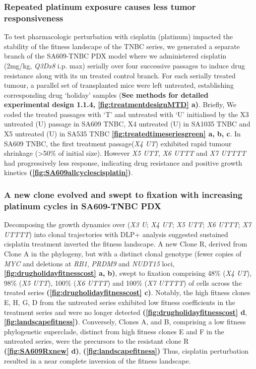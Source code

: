 \subsubsection{Repeated platinum exposure causes less tumor responsiveness} 
 To test pharmacologic perturbation with cisplatin (platinum) impacted the stability of the fitness landscape of the TNBC series, we generated a separate branch of the SA609-TNBC PDX model where we administered cisplatin (2mg/kg, \textit{Q3Dx8} i.p. max) serially over four successive passages to induce drug resistance along with its un treated control branch. For each serially treated tumour, a parallel set of transplanted mice were left untreated, establishing corresponding drug `holiday' samples (\textbf{See methods for detailed experimental design \textbf{1.1.4}, \textbf{\autoref{fig:treatmentdesignMTD} a)}}. Briefly, We coded the treated passages with `T' and untreated with `U' initialised by the X3 untreated (U) passage in SA609 TNBC, X4 untreated (U) in SA1035 TNBC and X5 untreated (U) in SA535 TNBC \textbf{\autoref{fig:treatedtimeseriesgreen} a, b, c}. In SA609 TNBC, the first treatment passage(\textit{X4 UT}) exhibited rapid tumour shrinkage (>50\% of initial size). However \textit{X5 UTT}, \textit{X6 UTTT} and \textit{X7 UTTTT} had progressively less response, indicating drug resistance and positive growth kinetics \textbf{(\autoref{fig:SA609allcyclescisplatin})}. 


\subsubsection{A new clone evolved and swept to fixation with increasing platinum cycles in SA609-TNBC PDX}
Decomposing the growth dynamics over (\textit{X3 U}; \textit{X4 UT}; \textit{X5 UTT}; \textit{X6 UTTT}; \textit{X7 UTTTT}) into clonal trajectories with DLP+ analysis suggested sustained cisplatin treatment inverted the fitness landscape. A new Clone R,  derived from Clone A in the phylogeny, but with a distinct clonal genotype (fewer copies of \textit{MYC} and deletions at \textit{RB1}, \textit{PRDM9} and \textit{NUDT15} loci, \textbf{\autoref{fig:drugholidayfitnesscost} a, b)}, swept to fixation comprising 48\% (\textit{X4 UT}), 98\% (\textit{X5 UTT}), 100\% (\textit{X6 UTTT}) and 100\% (\textit{X7 UTTTT}) of cells across the treated series \textbf{(\autoref{fig:drugholidayfitnesscost} c)}. Notably, the high fitness clones E, H, G, D from the untreated series exhibited low fitness coefficients in the treatment series and were no longer detected \textbf{(\autoref{fig:drugholidayfitnesscost} d}, \textbf{\autoref{fig:landscapefitness})}. Conversely, Clones A, and B, comprising a low fitness phylogenetic superclade, distinct from high fitness clones E and F in the untreated series, were the precursors to the resistant clone R \textbf{(\autoref{fig:SA609Rxnew} d)},    \textbf{(\autoref{fig:landscapefitness})} Thus, cisplatin perturbation resulted in a near complete inversion of the fitness landscape.

